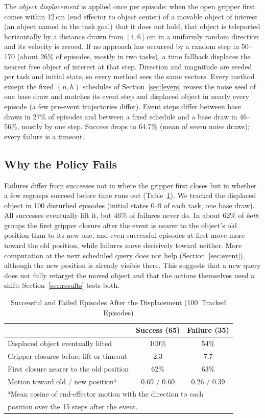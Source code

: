 \documentclass[conference,a4paper]{IEEEtran}
\begin{document}
The \emph{object displacement} is applied once per episode: when the open gripper first comes within 12\,cm (end effector to object center)
of a movable object of interest (an object named in the task goal) that it
does not hold, that object is teleported horizontally by a distance drawn from
$[4,6]$\,cm in a uniformly random direction and its velocity is zeroed. If no approach has occurred by a random step in 50--170 (about 26\% of episodes, mostly in two tasks), a time fallback displaces the nearest free object of interest at that step. Direction and magnitude are seeded per task and initial state, so every method sees the same vectors. Every method except the fixed $(n,h)$ schedules of Section~\ref{sec:levers} reuses the noise seed of one base draw and matches its event step and displaced object in nearly every episode (a few pre-event trajectories differ). Event steps differ between base draws in 27\% of episodes and between a fixed schedule and a base draw in 46--56\%, mostly by one step. Success drops to 64.7\% (mean of seven noise draws); every
failure is a timeout.

\subsection{Why the Policy Fails}
Failures differ from successes not in where the gripper first closes but in whether a few regrasps succeed before time runs out (Table~\ref{tab:diag}). We tracked the displaced object in 100 disturbed episodes (initial states 0--9 of each task, one base draw). All successes eventually lift it, but 46\% of
failures never do. In about 62\% of \emph{both} groups the first gripper closure after the
event is nearer to the object's old position than to its new one, and even successful episodes at first move more toward the old position, while failures move decisively toward neither. More computation at the next scheduled query does not help (Section~\ref{sec:event}), although the new position is already visible there.
This suggests that a new query does not fully retarget the moved object and that the actions themselves need a shift; Section~\ref{sec:results} tests both.

\begin{table}[t]
\caption{Successful and Failed Episodes After the Displacement (100~Tracked Episodes)}
\label{tab:diag}
\centering
\footnotesize
\begin{tabular}{lcc}
\toprule
 & Success (65) & Failure (35) \\
\midrule
Displaced object eventually lifted & 100\% & 54\% \\
Gripper closures before lift or timeout & 2.3 & 7.7 \\
First closure nearer to the old position & 62\% & 63\% \\
Motion toward old / new position$^{\mathrm{a}}$ & 0.69 / 0.60 & 0.26 / 0.39 \\
\bottomrule
\multicolumn{3}{l}{\scriptsize $^{\mathrm{a}}$Mean cosine of end-effector motion with the direction to each} \\
\multicolumn{3}{l}{\scriptsize position over the 15 steps after the event.}
\end{tabular}
\end{table}
\end{document}

